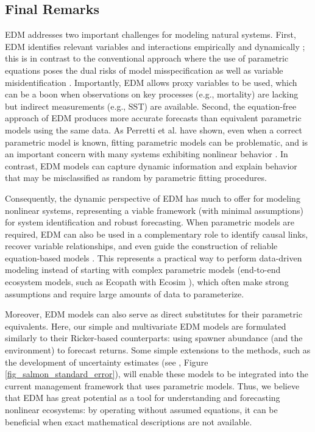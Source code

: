 \subsection{Final Remarks}

EDM addresses two important challenges for modeling natural systems. First, EDM identifies relevant variables and interactions empirically and dynamically \cite{Sugihara_2012}; this is in contrast to the conventional approach where the use of parametric equations poses the dual risks of model misspecification \cite{Sugihara_1994} as well as variable misidentification \cite{Sugihara_2012, Deyle_2013, Myers_1998}. Importantly, EDM allows proxy variables to be used, which can be a boon when observations on key processes (e.g., mortality) are lacking but indirect measurements (e.g., SST) are available. Second, the equation-free approach of EDM produces more accurate forecasts than equivalent parametric models using the same data. As Perretti et al. \cite{Perretti_2013} have shown, even when a correct parametric model is known, fitting parametric models can be problematic, and is an important concern with many systems exhibiting nonlinear behavior \cite{Hsieh_2005, Glaser_2014a}. In contrast, EDM models can capture dynamic information and explain behavior that may be misclassified as random by parametric fitting procedures.

Consequently, the dynamic perspective of EDM has much to offer for modeling nonlinear systems, representing a viable framework (with minimal assumptions) for system identification and robust forecasting. When parametric models are required, EDM can also be used in a complementary role to identify causal links, recover variable relationships, and even guide the construction of reliable equation-based models \cite{Crutchfield_1987}. This represents a practical way to perform data-driven modeling instead of starting with complex parametric models (end-to-end ecosystem models, such as Ecopath with Ecosim \cite{Christensen_2004}), which often make strong assumptions and require large amounts of data to parameterize.

Moreover, EDM models can also serve as direct substitutes for their parametric equivalents. Here, our simple and multivariate EDM models are formulated similarly to their Ricker-based counterparts: using spawner abundance (and the environment) to forecast returns. Some simple extensions to the methods, such as the development of uncertainty estimates (see , Figure \ref{fig_salmon_standard_error}), will enable these models to be integrated into the current management framework that uses parametric models. Thus, we believe that EDM has great potential as a tool for understanding and forecasting nonlinear ecosystems: by operating without assumed equations, it can be beneficial when exact mathematical descriptions are not available.

